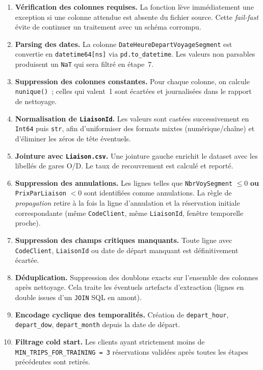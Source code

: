 \documentclass[11pt, a4paper]{article}
\begin{document}
\begin{enumerate}
\item \textbf{Vérification des colonnes requises.} La fonction lève
    immédiatement une exception si une colonne attendue est absente du
    fichier source. Cette \textit{fail-fast} évite de continuer un
    traitement avec un schéma corrompu.

\item \textbf{Parsing des dates.} La colonne
    \texttt{DateHeureDepartVoyageSegment} est convertie en
    \texttt{datetime64[ns]} via \texttt{pd.to\_datetime}. Les valeurs
    non parsables produisent un \texttt{NaT} qui sera filtré en étape~7.

\item \textbf{Suppression des colonnes constantes.} Pour chaque colonne,
    on calcule \texttt{nunique()}~; celles qui valent~1 sont écartées et
    journalisées dans le rapport de nettoyage.

\item \textbf{Normalisation de \texttt{LiaisonId}.} Les valeurs sont
    castées successivement en \texttt{Int64} puis \texttt{str}, afin
    d'uniformiser des formats mixtes (numérique/chaîne) et d'éliminer
    les zéros de tête éventuels.

\item \textbf{Jointure avec \texttt{Liaison.csv}.} Une jointure gauche
    enrichit le dataset avec les libellés de gares O/D. Le taux de
    recouvrement est calculé et reporté.

\item \textbf{Suppression des annulations.}
    Les lignes telles que \texttt{NbrVoySegment} $\leq 0$
    \textbf{ou} \texttt{PrixParLiaison} $< 0$ sont identifiées comme
    annulations. La règle de \textit{propagation} retire à la fois la
    ligne d'annulation et la réservation initiale correspondante (même
    \texttt{CodeClient}, même \texttt{LiaisonId}, fenêtre temporelle
    proche).

\item \textbf{Suppression des champs critiques manquants.}
    Toute ligne avec \texttt{CodeClient}, \texttt{LiaisonId} ou date de
    départ manquant est définitivement écartée.

\item \textbf{Déduplication.} Suppression des doublons exacts sur
    l'ensemble des colonnes après nettoyage. Cela traite les éventuels
    artefacts d'extraction (lignes en double issues d'un \texttt{JOIN}
    SQL en amont).

\item \textbf{Encodage cyclique des temporalités.} Création de
    \texttt{depart\_hour}, \texttt{depart\_dow}, \texttt{depart\_month}
    depuis la date de départ.

\item \textbf{Filtrage cold start.} Les clients ayant strictement moins
    de \texttt{MIN\_TRIPS\_FOR\_TRAINING~=~3} réservations validées
    après toutes les étapes précédentes sont retirés.
\end{enumerate}
\end{document}
